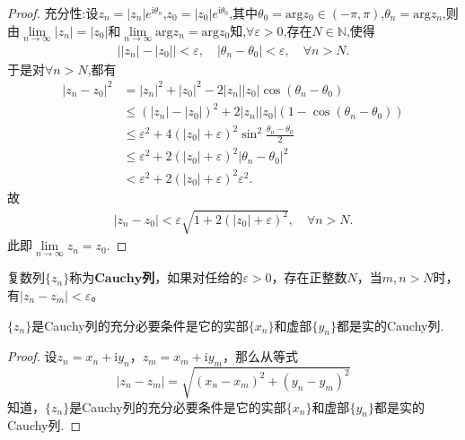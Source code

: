 \documentclass[../../main.tex]{subfiles}%
\begin{document}
\begin{proof}
{\heiti 充分性:}设$z_n=\left| z_n \right|e^{\mathrm{i}\theta _n}$,$z_0=\left| z_0 \right|e^{\mathrm{i}\theta _0}$,其中$\theta _0=\mathrm{arg}z_0\in \left( -\pi ,\pi \right)$,$\theta _n=\mathrm{arg}z_n$,则由$\lim\limits_{n\rightarrow \infty}\left| z_n \right|=\left| z_0 \right|$和$\lim\limits_{n\rightarrow \infty}\mathrm{arg}z_n=\mathrm{arg}z_0$知,$\forall \varepsilon >0$,存在$N\in \mathbb{N}$,使得
\begin{align*}
\left| \left| z_n \right|-\left| z_0 \right| \right|<\varepsilon,\quad \left| \theta _n-\theta _0 \right|<\varepsilon,\quad \forall n>N.
\end{align*}
于是对$\forall n>N$,都有
\begin{align*}
\left| z_n-z_0 \right|^2&=\left| z_n \right|^2+\left| z_0 \right|^2-2\left| z_n \right|\left| z_0 \right|\cos \left( \theta _n-\theta _0 \right) \\
&\leqslant \left( \left| z_n \right|-\left| z_0 \right| \right) ^2+2\left| z_n \right|\left| z_0 \right|\left( 1-\cos \left( \theta _n-\theta _0 \right) \right) \\
&\leqslant \varepsilon ^2+4\left( \left| z_0 \right|+\varepsilon \right) ^2\sin ^2\frac{\theta _n-\theta _0}{2} \\
&\leqslant \varepsilon ^2+2\left( \left| z_0 \right|+\varepsilon \right) ^2\left| \theta _n-\theta _0 \right|^2 \\
&<\varepsilon ^2+2\left( \left| z_0 \right|+\varepsilon \right) ^2\varepsilon ^2.
\end{align*}
故
\begin{align*}
\left| z_n-z_0 \right|<\varepsilon \sqrt{1+2\left( \left| z_0 \right|+\varepsilon \right) ^2},\quad \forall n>N.
\end{align*}
此即$\lim\limits_{n\rightarrow \infty}z_n=z_0$.
\end{proof}

\begin{definition}
复数列\(\{ z_n \}\)称为\(\mathbf{Cauchy}\)\textbf{列}，如果对任给的\(\varepsilon > 0\)，存在正整数\(N\)，当\(m, n > N\)时，有\(| z_n - z_m | < \varepsilon\)。
\end{definition}

\begin{theorem}\label{theorem:复数Cauchy列充要条件}
\(\{ z_n \}\)是Cauchy列的充分必要条件是它的实部\(\{ x_n \}\)和虚部\(\{ y_n \}\)都是实的Cauchy列.
\end{theorem}
\begin{proof}
设\(z_n = x_n + \mathrm{i}y_n\)，\(z_m = x_m + \mathrm{i}y_m\)，那么从等式
\[
| z_n - z_m | = \sqrt{(x_n - x_m)^2 + (y_n - y_m)^2}
\]
知道，\(\{ z_n \}\)是Cauchy列的充分必要条件是它的实部\(\{ x_n \}\)和虚部\(\{ y_n \}\)都是实的Cauchy列.
\end{proof}
\end{document}
